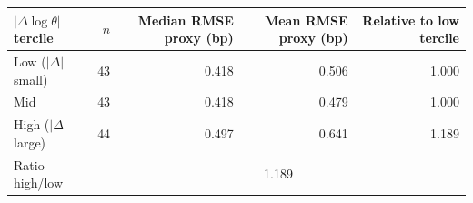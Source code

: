 \begin{tabular}{@{}lrrrr@{}}
\toprule
$|\Delta\!\log\theta|$ tercile & $n$ & Median RMSE proxy (bp) & Mean RMSE proxy (bp) & Relative to low tercile \\
\midrule
Low ($|\Delta|$ small) & 43 & 0.418 & 0.506 & 1.000 \\
Mid & 43 & 0.418 & 0.479 & 1.000 \\
High ($|\Delta|$ large) & 44 & 0.497 & 0.641 & 1.189 \\
\midrule
Ratio high/low & \multicolumn{4}{c}{1.189} \\
\bottomrule
\end{tabular}